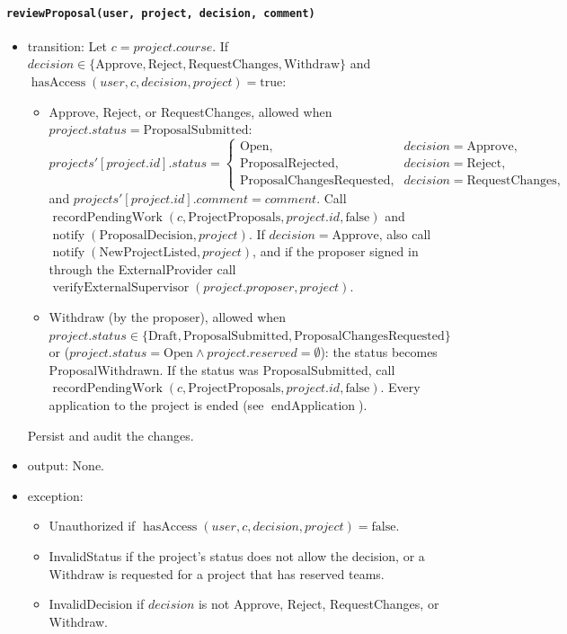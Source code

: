 \documentclass[12pt, titlepage]{article}
\begin{document}
\paragraph{\texttt{reviewProposal(user, project, decision, comment)}}
\begin{itemize}
    \item transition: Let $c=project.course$. If $decision\in\{\text{Approve},\text{Reject},\text{RequestChanges},\text{Withdraw}\}$ and $\operatorname{hasAccess}(user,c,decision,project)=\text{true}$:
    \begin{itemize}
        \item Approve, Reject, or RequestChanges, allowed when $project.status=\text{ProposalSubmitted}$:
        \[
        \mathit{projects}'[project.id].status=
        \begin{cases}
            \text{Open}, & decision=\text{Approve},\\
            \text{ProposalRejected}, & decision=\text{Reject},\\
            \text{ProposalChangesRequested}, & decision=\text{RequestChanges},
        \end{cases}
        \]
        and $\mathit{projects}'[project.id].comment=comment$. Call $\operatorname{recordPendingWork}(c,\text{ProjectProposals},project.id,\text{false})$ and $\operatorname{notify}(\text{ProposalDecision},project)$. If $decision=\text{Approve}$, also call $\operatorname{notify}(\text{NewProjectListed},project)$, and if the proposer signed in through the ExternalProvider call $\operatorname{verifyExternalSupervisor}(project.proposer,project)$.
        \item Withdraw (by the proposer), allowed when $project.status\in\{\text{Draft},\text{ProposalSubmitted},\text{ProposalChangesRequested}\}$ or ($project.status=\text{Open}\land project.reserved=\emptyset$): the status becomes ProposalWithdrawn. If the status was ProposalSubmitted, call $\operatorname{recordPendingWork}(c,\text{ProjectProposals},project.id,\text{false})$. Every application to the project is ended (see $\operatorname{endApplication}$).
    \end{itemize}
    Persist and audit the changes.
    \item output: None.
    \item exception:
    \begin{itemize}
        \item Unauthorized if $\operatorname{hasAccess}(user,c,decision,project)=\text{false}$.
        \item InvalidStatus if the project's status does not allow the decision, or a Withdraw is requested for a project that has reserved teams.
        \item InvalidDecision if $decision$ is not Approve, Reject, RequestChanges, or Withdraw.
    \end{itemize}
\end{itemize}
\end{document}
